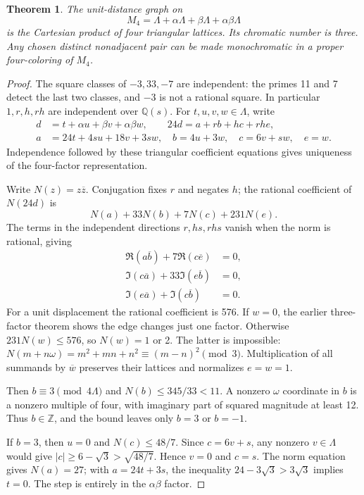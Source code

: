 \documentclass[11pt,letterpaper]{article}
\newtheorem{theorem}{Theorem}
\begin{document}
\begin{theorem}
The unit-distance graph on
\[
 M_4=\Lambda+\alpha\Lambda+\beta\Lambda+\alpha\beta\Lambda
\]
is the Cartesian product of four triangular lattices. Its
chromatic number is three. Any chosen distinct nonadjacent pair
can be made monochromatic in a proper four-coloring of \(M_4\).
\end{theorem}
\begin{proof}
The square classes of \(-3,33,-7\) are independent: the primes
11 and 7 detect the last two classes, and \(-3\) is not a rational
square. In particular \(1,r,h,rh\) are independent over
\(\mathbb Q(s)\). For \(t,u,v,w\in\Lambda\), write
\[
\begin{split}
 d &=t+\alpha u+\beta v+\alpha\beta w,\qquad
 24d=a+rb+hc+rh e,\\
 a&=24t+4su+18v+3sw,\quad b=4u+3w,\quad
 c=6v+sw,\quad e=w.
\end{split}
\]
Independence followed by these triangular coefficient equations
gives uniqueness of the four-factor representation.

Write \(N(z)=z\overline z\). Conjugation fixes \(r\) and
negates \(h\); the rational coefficient of \(N(24d)\) is
\[
 N(a)+33N(b)+7N(c)+231N(e).
\]
The terms in the independent directions \(r,hs,rhs\) vanish
when the norm is rational, giving
\[
\begin{split}
 \Re(a\overline b)+7\Re(c\overline e)&=0,\\
 \Im(c\overline a)+33\Im(e\overline b)&=0,\\
 \Im(e\overline a)+\Im(c\overline b)&=0.
\end{split}
\]
For a unit displacement the rational coefficient is 576. If
\(w=0\), the earlier three-factor theorem shows the edge changes
just one factor. Otherwise \(231N(w)\le576\), so \(N(w)=1\)
or 2. The latter is impossible:
\(N(m+n\omega)=m^2+mn+n^2\equiv(m-n)^2\pmod3\).
Multiplication of all summands by \(\overline w\) preserves their
lattices and normalizes \(e=w=1\).

Then \(b\equiv3\pmod{4\Lambda}\) and
\(N(b)\le345/33<11\). A nonzero \(\omega\) coordinate
in \(b\) is a nonzero multiple of four, with imaginary part
of squared magnitude at least 12. Thus \(b\in\mathbb Z\),
and the bound leaves only \(b=3\) or \(b=-1\).

If \(b=3\), then \(u=0\) and \(N(c)\le48/7\). Since
\(c=6v+s\), any nonzero \(v\in\Lambda\) would give
\(|c|\ge 6-\sqrt3>\sqrt{48/7}\). Hence \(v=0\) and
\(c=s\). The norm equation gives \(N(a)=27\); with
\(a=24t+3s\), the inequality \(24-3\sqrt3>3\sqrt3\)
implies \(t=0\). The step is entirely in the
\(\alpha\beta\) factor.


\end{proof}
\end{document}
